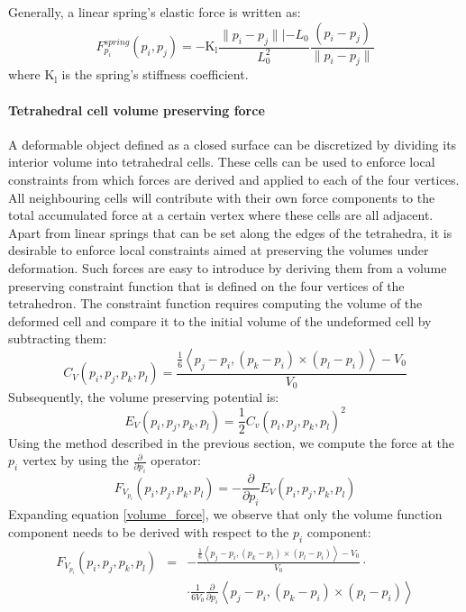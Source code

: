\documentclass[12pt]{article}
\begin{document}
Generally, a linear spring's elastic force is written as:
\begin{equation}
\label{elastic_force}
F_{p_i}^{spring}(p_i,p_j) =  - \mathrm{K_l}\frac{\|p_i - p_j\|| - L_0}{L_0^2} \frac{(p_i - p_j)}{\| p_i - p_j\|}
\end{equation}
where $\mathrm{K_l}$ is the spring's stiffness coefficient. 

\paragraph{Tetrahedral cell volume preserving force}
A deformable object defined as a closed surface can be discretized by dividing its interior volume into tetrahedral cells. These cells can be used to enforce local constraints from which forces are derived and applied to each of the four vertices. All neighbouring cells will contribute with their own force components to the total accumulated force at a certain vertex where these cells are all adjacent. Apart from linear springs that can be set along the edges of the tetrahedra, it is desirable to enforce local constraints aimed at preserving the volumes under deformation. Such forces are easy to introduce by deriving them from a volume preserving constraint function that is defined on the four vertices of the tetrahedron. The constraint function requires computing the volume of the deformed cell and compare it to the initial volume of the undeformed cell by subtracting them:
\begin{equation}
\label{voume_constraint}
C_V(p_i, p_j, p_k, p_l) = \frac{\frac{1}{6}\left\langle p_j - p_i, (p_k - p_i) \times (p_l - p_i)\right\rangle - V_0}{V_0}
\end{equation}
Subsequently, the volume preserving potential is:
\begin{equation}
\label{volume_potential}
E_V(p_i, p_j, p_k, p_l) = \frac{1}{2} C_v(p_i, p_j,p_k,p_l)^2
\end{equation}
Using the method described in the previous section, we compute the force at the $p_i$ vertex by using the $\frac{\partial}{\partial p_i}$ operator:
\begin{equation}
\label{volume_force}
F_{V_{p_i}}(p_i, p_j, p_k, p_l) = - \frac{\partial}{\partial p_i} E_V(p_i, p_j, p_k, p_l)
\end{equation}
Expanding equation \ref{volume_force}, we observe that only the volume function component needs to be derived with respect to the $p_i$ component:
\begin{align*}
F_{V_{p_i}}(p_i, p_j, p_k, p_l) & = & - \frac{\frac{1}{6}\left\langle p_j - p_i, (p_k - p_i) \times (p_l - p_i)\right\rangle - V_0}{V_0} \cdot \\
& & \cdot \frac{1}{6V_0} \frac{\partial}{\partial p_i}{\left\langle p_j - p_i, (p_k - p_i) \times (p_l - p_i)\right\rangle}
\end{align*}
\end{document}
